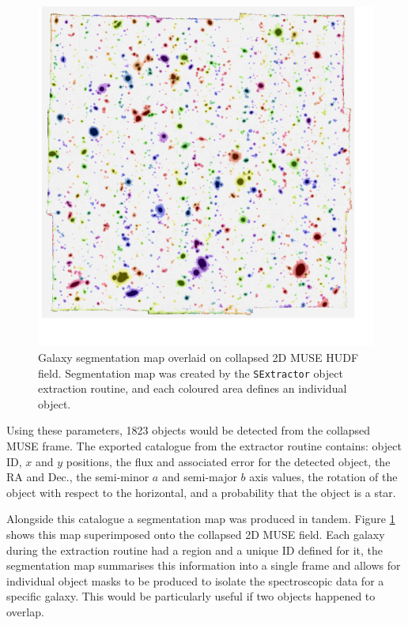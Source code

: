 \documentclass[12pt, twocolumn, nofootinbib]{revtex4-1}    %
\begin{document}
\begin{figure}
\includegraphics[width=\linewidth]{data/muse_seg_map.pdf}
\caption[MUSE Segmented]{Galaxy segmentation map overlaid on collapsed 2D MUSE HUDF field. Segmentation map was created by the \texttt{SExtractor} object extraction routine, and each coloured area defines an individual object.}
\label{fig:muse_seg_map}
\end{figure}

Using these parameters, 1823 objects would be detected from the collapsed MUSE frame. The exported catalogue from the extractor routine contains: object ID, $x$ and $y$ positions, the flux and associated error for the detected object, the RA and Dec., the semi-minor $a$ and semi-major $b$ axis values, the rotation of the object with respect to the horizontal, and a probability that the object is a star. 

Alongside this catalogue a segmentation map was produced in tandem. Figure \ref{fig:muse_seg_map} shows this map superimposed onto the collapsed 2D MUSE field. Each galaxy during the extraction routine had a region and a unique ID defined for it, the segmentation map summarises this information into a single frame and allows for individual object masks to be produced to isolate the spectroscopic data for a specific galaxy. This would be particularly useful if two objects happened to overlap. 
\end{document}
